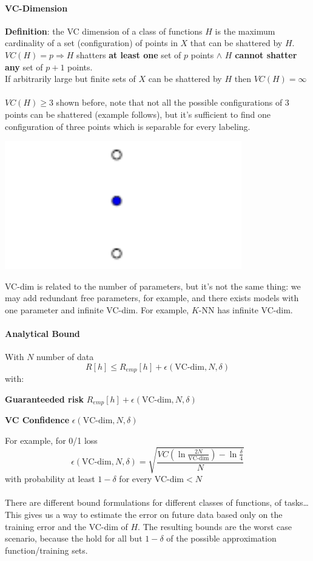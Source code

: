 \documentclass[10pt]{report}
\begin{document}
\paragraph{VC-Dimension} \textbf{Definition}: the VC dimension of a class of functions $H$ is the maximum cardinality of a set (configuration) of points in $X$ that can be shattered by $H$.\\
$VC(H) = p \Rightarrow H$ shatters \textbf{at least one} set of $p$ points $\wedge$ $H$ \textbf{cannot shatter any} set of $p+1$ points.\\
If arbitrarily large but finite sets of $X$ can be shattered by $H$ then $VC(H) = \infty$\\\\
$VC(H)\geq 3$ shown before, note that not all the possible configurations of $3$ points can be shattered (example follows), but it's sufficient to find one configuration of three points which is separable for every labeling.
\begin{center}
	\includegraphics[scale=0.5]{15.png}
\end{center}
VC-dim is related to the number of parameters, but it's not the same thing: we may add redundant free parameters, for example, and there exists models with one parameter and infinite VC-dim. For example, $K$-NN has infinite VC-dim.
\paragraph{Analytical Bound} With $N$ number of data $$R[h]\leq R_{emp}[h] + \epsilon\left(\text{VC-dim}, N, \delta\right)$$
with:
\begin{list}{}{}
	\item \textbf{Guaranteeded risk} $R_{emp}[h] + \epsilon\left(\text{VC-dim}, N, \delta\right)$
	\item \textbf{VC Confidence} $\epsilon\left(\text{VC-dim}, N, \delta\right)$
\end{list}
For example, for 0/1 loss $$\epsilon\left(\text{VC-dim}, N, \delta\right) = \sqrt{\frac{VC\left(\ln\frac{2N}{\text{VC-dim}}\right) - \ln\frac{\delta}{4}}{N}}$$ with probability at least $1-\delta$ for every VC-dim$< N$\\\\
There are different bound formulations for different classes of functions, of tasks\ldots\\
This gives us a way to estimate the error on future data based only on the training error and the VC-dim of $H$. The resulting bounds are the worst case scenario, because the hold for all but $1-\delta$ of the possible approximation function/training sets.
\end{document}
